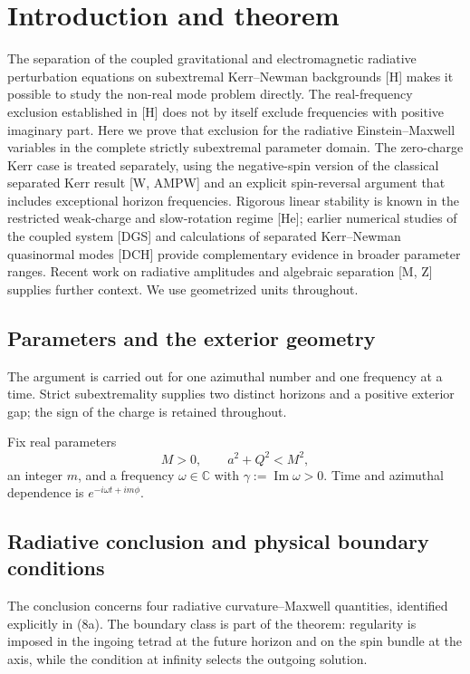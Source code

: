 \documentclass[11pt,a4paper]{article}
\begin{document}
\section{Introduction and theorem}\label{introduction-and-theorem}

The separation of the coupled gravitational and electromagnetic
radiative perturbation equations on subextremal Kerr--Newman backgrounds
{[}H{]} makes it possible to study the non-real mode problem directly.
The real-frequency exclusion established in {[}H{]} does not by itself
exclude frequencies with positive imaginary part. Here we prove that
exclusion for the radiative Einstein--Maxwell variables in the complete
strictly subextremal parameter domain. The zero-charge Kerr case is
treated separately, using the negative-spin version of the classical
separated Kerr result {[}W, AMPW{]} and an explicit spin-reversal
argument that includes exceptional horizon frequencies. Rigorous linear
stability is known in the restricted weak-charge and slow-rotation
regime {[}He{]}; earlier numerical studies of the coupled system
{[}DGS{]} and calculations of separated Kerr--Newman quasinormal modes
{[}DCH{]} provide complementary evidence in broader parameter ranges.
Recent work on radiative amplitudes and algebraic separation {[}M, Z{]}
supplies further context. We use geometrized units throughout.

\subsection{Parameters and the exterior geometry}\label{readable-parameters}

The argument is carried out for one azimuthal number and one frequency at a time. Strict subextremality supplies two distinct horizons and a positive exterior gap; the sign of the charge is retained throughout.

Fix real parameters \[
 M>0,\qquad a^2+Q^2<M^2,
\] an integer \(m\), and a frequency \(\omega\in\mathbb C\) with
\(\gamma:=\operatorname{Im}\omega>0\). Time and azimuthal dependence is
\(e^{-i\omega t+im\phi}\).

\subsection{Radiative conclusion and physical boundary conditions}\label{readable-theorem}

The conclusion concerns four radiative curvature--Maxwell quantities, identified explicitly in (8a). The boundary class is part of the theorem: regularity is imposed in the ingoing tetrad at the future horizon and on the spin bundle at the axis, while the condition at infinity selects the outgoing solution.
\end{document}
